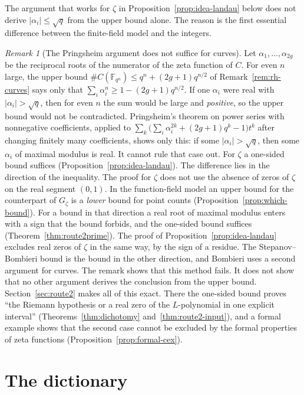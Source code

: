 \documentclass[11pt]{amsbook}
\theoremstyle{plain}
\theoremstyle{definition}
\theoremstyle{remark}
\newtheorem{remark}[theorem]{Remark}
\numberwithin{equation}{section}
\numberwithin{figure}{chapter}
\numberwithin{table}{chapter}
\newcommand{\F}{\mathbb{F}}
\newcommand{\Gz}{G_{\zeta}}
\begin{document}
The argument that works for $\zeta$ in
Proposition~\ref{prop:idea-landau} below does not derive
$|\alpha_i| \le \sqrt q$ from the upper bound alone. The reason is
the first essential difference between the finite-field model and
the integers.

\begin{remark}[The Pringsheim argument does not suffice for curves]
\label{rem:one-sided-curves}
Let $\alpha_1, \dots, \alpha_{2g}$ be the reciprocal roots of the
numerator of the zeta function of $C$. For even $n$ large, the upper
bound $\#C(\F_{q^n}) \le q^n + (2g+1)q^{n/2}$ of
Remark~\ref{rem:rh-curves} says only that
$\sum_i \alpha_i^n \ge 1 - (2g+1)q^{n/2}$. If one $\alpha_i$ were
real with $|\alpha_i| > \sqrt q$, then for even $n$ the sum would be
large and \emph{positive}, so the upper bound would not be
contradicted. Pringsheim's theorem on power series with nonnegative
coefficients, applied to
$\sum_k \bigl(\sum_i\alpha_i^{2k} + (2g+1)q^k - 1\bigr)t^k$ after
changing finitely many coefficients, shows only this: if some
$|\alpha_i| > \sqrt q$, then some $\alpha_i$ of maximal modulus is
real. It cannot rule that case out. For $\zeta$ a one-sided bound
suffices (Proposition~\ref{prop:idea-landau}). The difference lies
in the direction of the inequality. The proof for $\zeta$ does not
use the absence of zeros of $\zeta$ on the real segment $(0,1)$. In
the function-field model an upper bound for the counterpart of
$\Gz$ is a \emph{lower} bound for point counts
(Proposition~\ref{prop:which-bound}). For a bound in that direction
a real root of maximal modulus enters with a sign that the bound
forbids, and the one-sided bound suffices
(Theorem~\ref{thm:route2prime}). The proof of
Proposition~\ref{prop:idea-landau} excludes real zeros of $\zeta$
in the same way, by the sign of a residue. The Stepanov--Bombieri
bound is the bound in the other direction, and Bombieri uses a
second argument for curves. The remark shows that this method
fails. It does not show that no other argument derives the
conclusion from the upper bound. Section~\ref{sec:route2} makes all
of this exact. There the one-sided bound proves ``the Riemann
hypothesis or a real zero of
the $L$-polynomial in one explicit interval''
(Theorems~\ref{thm:dichotomy} and~\ref{thm:route2-input}), and a
formal example shows that the second case cannot be excluded by the
formal properties of zeta functions
(Proposition~\ref{prop:formal-cex}).
\end{remark}

\section{The dictionary}\label{sec:idea-dictionary}
\end{document}
